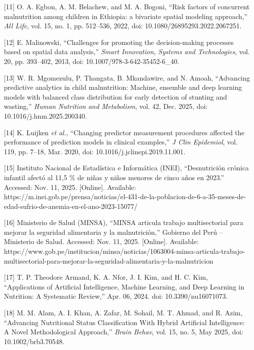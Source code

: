 \documentclass[
]{report}
\begin{document}
{[}11{]} O. A. Egbon, A. M. Belachew, and M. A. Bogoni, ``Risk factors
of concurrent malnutrition among children in Ethiopia: a bivariate
spatial modeling approach,'' \emph{All Life}, vol. 15, no. 1, pp.
512--536, 2022, doi: 10.1080/26895293.2022.2067251.

{[}12{]} E. Malinowski, ``Challenges for promoting the decision-making
processes based on spatial data analysis,'' \emph{Smart Innovation,
Systems and Technologies}, vol. 20, pp. 393--402, 2013, doi:
10.1007/978-3-642-35452-6\_40.

{[}13{]} W. R. Mgomezulu, P. Thangata, B. Mkandawire, and N. Amoah,
``Advancing predictive analytics in child malnutrition: Machine,
ensemble and deep learning models with balanced class distribution for
early detection of stunting and wasting,'' \emph{Human Nutrition and
Metabolism}, vol. 42, Dec. 2025, doi: 10.1016/j.hnm.2025.200340.

{[}14{]} K. Luijken \emph{et al.}, ``Changing predictor measurement
procedures affected the performance of prediction models in clinical
examples,'' \emph{J Clin Epidemiol}, vol. 119, pp. 7--18, Mar. 2020,
doi: 10.1016/j.jclinepi.2019.11.001.

{[}15{]} Instituto Nacional de Estadística e Informática (INEI),
``Desnutrición crónica infantil afectó al 11,5 \% de niñas y niños
menores de cinco años en 2023.'' Accessed: Nov. 11, 2025. {[}Online{]}.
Available:
https://m.inei.gob.pe/prensa/noticias/el-431-de-la-poblacion-de-6-a-35-meses-de-edad-sufrio-de-anemia-en-el-ano-2023-15077/

{[}16{]} Ministerio de Salud (MINSA), ``MINSA articula trabajo
multisectorial para mejorar la seguridad alimentaria y la
malnutrición,'' Gobierno del Perú -- Ministerio de Salud. Accessed: Nov.
11, 2025. {[}Online{]}. Available:
https://www.gob.pe/institucion/minsa/noticias/1063004-minsa-articula-trabajo-multisectorial-para-mejorar-la-seguridad-alimentaria-y-la-malnutricion

{[}17{]} T. P. Theodore Armand, K. A. Nfor, J. I. Kim, and H. C. Kim,
``Applications of Artificial Intelligence, Machine Learning, and Deep
Learning in Nutrition: A Systematic Review,'' Apr. 06, 2024. doi:
10.3390/nu16071073.

{[}18{]} M. M. Alam, A. I. Khan, A. Zafar, M. Sohail, M. T. Ahmad, and
R. Azim, ``Advancing Nutritional Status Classification With Hybrid
Artificial Intelligence: A Novel Methodological Approach,'' \emph{Brain
Behav}, vol. 15, no. 5, May 2025, doi: 10.1002/brb3.70548.
\end{document}
